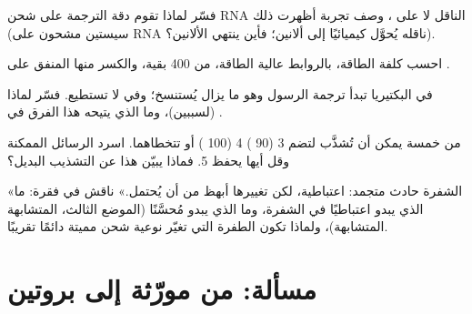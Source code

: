 \begin{exercise}[$\star\star$]\label{exo:b1:gene-expression:8}
فسّر لماذا تقوم دقة الترجمة على  شحن RNA الناقل لا على
، وصف تجربة أظهرت ذلك (سيستين مشحون على RNA ناقله يُحوَّل
كيميائيًا إلى ألانين؛ فأين ينتهي الألانين؟).
\end{exercise}

\begin{exercise}[$\star\star$]\label{exo:b1:gene-expression:9}
احسب كلفة الطاقة، بالروابط عالية الطاقة،  من \qty{400}{}
بقية، والكسر منها المنفق على .
\end{exercise}

\begin{exercise}[$\star\star\star$]\label{exo:b1:gene-expression:10}
في البكتيريا تبدأ  ترجمة الرسول وهو ما يزال يُستنسخ؛
وفي  لا تستطيع. فسّر لماذا (لسببين)، وما الذي يتيحه
هذا الفرق في .
\end{exercise}

\begin{exercise}[$\star\star\star$]\label{exo:b1:gene-expression:11}
 من خمسة  يمكن أن تُشذَّب لتضم  3
(\qty{90}{} )  4 (\qty{100}{} ) أو
تتخطاهما. اسرد الرسائل الممكنة وقل أيها يحفظ   5.
فماذا يبيّن هذا عن التشذيب البديل؟
\end{exercise}

\begin{exercise}[$\star\star\star$]\label{exo:b1:gene-expression:12}
«الشفرة حادث متجمد: اعتباطية، لكن تغييرها أبهظ من أن يُحتمل.» ناقش
في فقرة: ما الذي يبدو اعتباطيًا في الشفرة، وما الذي يبدو مُحسَّنًا
(الموضع الثالث،  المتشابهة  المتشابهة)،
ولماذا تكون الطفرة التي تغيّر نوعية  شحن مميتة دائمًا تقريبًا.
\end{exercise}

\section{مسألة: من مورّثة إلى بروتين}

